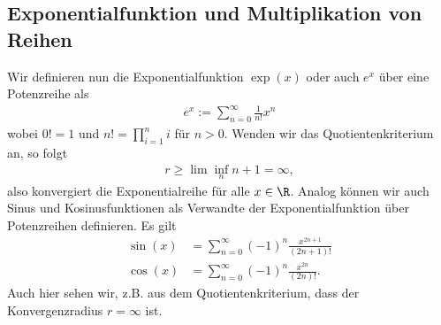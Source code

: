 \documentclass[letterpaper,10pt,english]{jupyterBook}
\begin{document}
\subsection{Exponentialfunktion und Multiplikation von Reihen}
\label{\detokenize{metrik/potenzreihen:exponentialfunktion-und-multiplikation-von-reihen}}
Wir definieren nun die Exponentialfunktion \(\exp(x)\) oder auch \(e^x\) über eine Potenzreihe als
\begin{equation*}
\begin{split} e^x:= \sum_{n=0}^\infty \frac{1}{n!} x^n\end{split}
\end{equation*}
wobei \(0!=1\) und \(n! = \prod_{i=1}^n i\) für \(n > 0\). Wenden wir das Quotientenkriterium an, so folgt
\begin{equation*}
\begin{split} r \geq \lim\inf_n n+1 = \infty,\end{split}
\end{equation*}
also konvergiert die Exponentialreihe für alle \(x \in \R\).
Analog können wir auch Sinus\sphinxhyphen{} und Kosinusfunktionen als Verwandte der Exponentialfunktion über Potenzreihen definieren. Es gilt
\begin{align*}
\sin(x) &= \sum_{n=0}^\infty (-1)^n \frac{x^{2n+1}}{(2n+1)!} \\
\cos(x) &= \sum_{n=0}^\infty (-1)^n \frac{x^{2n }}{(2n )!}.
\end{align*}
Auch hier sehen wir, z.B. aus dem Quotientenkriterium, dass der Konvergenzradius \(r=\infty\) ist.
\end{document}
